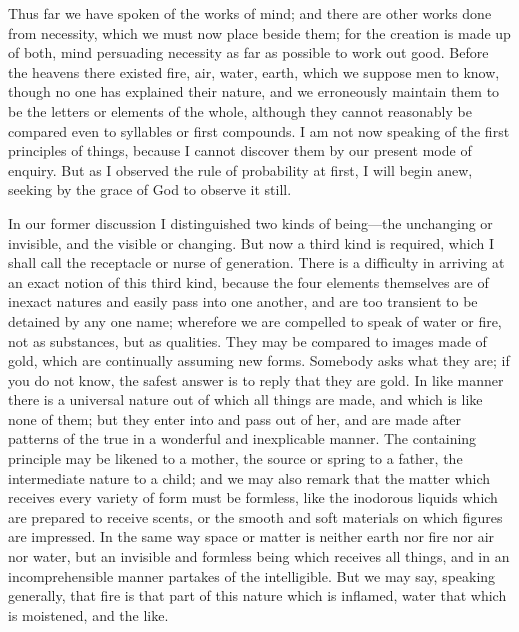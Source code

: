 Thus far we have spoken of the works of mind; and there are other works
done from necessity, which we must now place beside them; for the creation
is made up of both, mind persuading necessity as far as possible to work
out good. Before the heavens there existed fire, air, water, earth, which
we suppose men to know, though no one has explained their nature, and we
erroneously maintain them to be the letters or elements of the whole,
although they cannot reasonably be compared even to syllables or first
compounds. I am not now speaking of the first principles of things,
because I cannot discover them by our present mode of enquiry. But as I
observed the rule of probability at first, I will begin anew, seeking by
the grace of God to observe it still.

In our former discussion I distinguished two kinds of being—the
unchanging or invisible, and the visible or changing. But now a third kind
is required, which I shall call the receptacle or nurse of generation.
There is a difficulty in arriving at an exact notion of this third kind,
because the four elements themselves are of inexact natures and easily
pass into one another, and are too transient to be detained by any one
name; wherefore we are compelled to speak of water or fire, not as
substances, but as qualities. They may be compared to images made of gold,
which are continually assuming new forms. Somebody asks what they are; if
you do not know, the safest answer is to reply that they are gold. In like
manner there is a universal nature out of which all things are made, and
which is like none of them; but they enter into and pass out of her, and
are made after patterns of the true in a wonderful and inexplicable
manner. The containing principle may be likened to a mother, the source or
spring to a father, the intermediate nature to a child; and we may also
remark that the matter which receives every variety of form must be
formless, like the inodorous liquids which are prepared to receive scents,
or the smooth and soft materials on which figures are impressed. In the
same way space or matter is neither earth nor fire nor air nor water, but
an invisible and formless being which receives all things, and in an
incomprehensible manner partakes of the intelligible. But we may say,
speaking generally, that fire is that part of this nature which is
inflamed, water that which is moistened, and the like.

